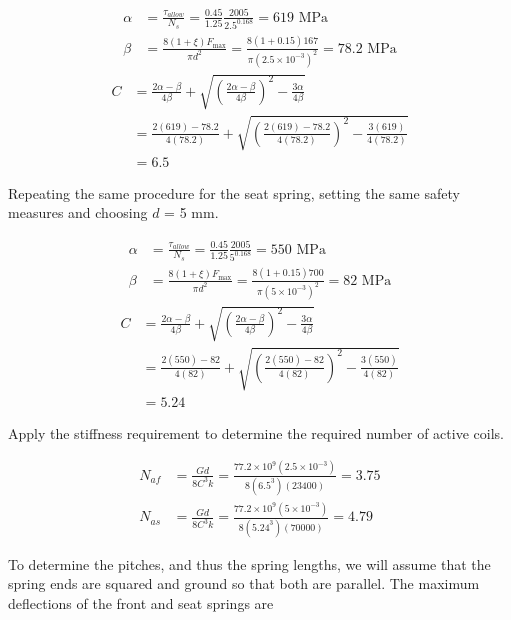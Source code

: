 \documentclass[
10pt,
a4paper,
openany,
svgnames,
]{book}
\begin{document}
\begin{solution}
  \begin{align*}
    \alpha  &= \frac{\tau _{allow}}{N_s} = \frac{0.45}{1.25}\frac{2005}{2.5^{0.168}} = 619 \text{ MPa} \\ 
    \beta  &= \frac{8(1 + \xi )F_{\max}}{\pi d^2} = \frac{8(1 + 0.15)167}{\pi (2.5 \times 10^{-3})^2} = 78.2 \text{ MPa}
  \end{align*}
  \begin{align*}
    C &= \frac{2\alpha  - \beta}{4\beta} + \sqrt {\left( \frac{2\alpha  - \beta}{4\beta} \right)^2 - \frac{3\alpha}{4\beta}}  \\ 
      & = \frac{2(619) - 78.2}{4(78.2)} + \sqrt {\left( \frac{2(619) - 78.2}{4(78.2)} \right)^2 - \frac{3(619)}{4(78.2)}}  \\ 
      &= 6.5 
  \end{align*}

  Repeating the same procedure for the seat spring, setting the same safety measures and choosing $d$ = 5 mm.

  \begin{align*}
    \alpha &= \frac{\tau_{allow}}{N_s} = \frac{0.45}{1.25}\frac{2005}{5^{0.168}} = 550\text{ MPa} \\ 
    \beta &= \frac{8(1 + \xi )F_{\max}}{\pi d^2} = \frac{8(1 + 0.15)700}{\pi (5 \times 10^{-3})^2} = 82\text{ MPa}
  \end{align*}
  \begin{align*}
    C &= \frac{2\alpha  - \beta}{4\beta} + \sqrt {\left( \frac{2\alpha  - \beta}{4\beta} \right)^2 - \frac{3\alpha}{4\beta}}  \\ 
      &= \frac{2(550) - 82}{4(82)} + \sqrt {\left( \frac{2(550) - 82}{4(82)} \right)^2 - \frac{3(550)}{4(82)}}  \\ 
      &= 5.24
  \end{align*}

  Apply the stiffness requirement to determine the required number of active coils.

  \begin{align*}
    N_{af} &= \frac{Gd}{8C^3k} = \frac{77.2 \times 10^9(2.5 \times 10^{-3})}{8(6.5^3)(23400)} = 3.75 \\
    N_{as} &= \frac{Gd}{8C^3k} = \frac{77.2 \times 10^9(5 \times 10^{-3})}{8(5.24^3)(70000)} = 4.79
  \end{align*}

  To determine the pitches, and thus the spring lengths, we will assume that the spring ends are squared and ground so that both are parallel. The maximum deflections of the front and seat springs are


\end{solution}
\end{document}
